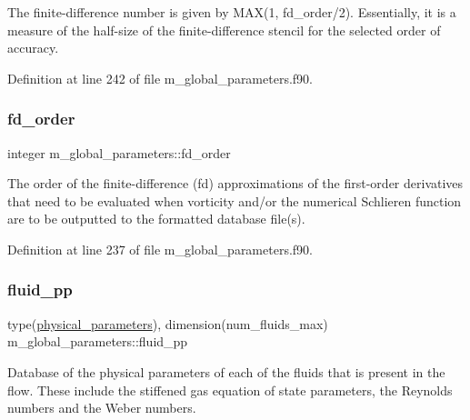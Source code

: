 The finite-\/difference number is given by M\+AX(1, fd\+\_\+order/2). Essentially, it is a measure of the half-\/size of the finite-\/difference stencil for the selected order of accuracy. 



Definition at line 242 of file m\+\_\+global\+\_\+parameters.\+f90.

\mbox{\label{namespacem__global__parameters_a8892cc67c7d04be4d8e6d02a86e209bc}} 
\subsubsection{\texorpdfstring{fd\+\_\+order}{fd\_order}}
{\footnotesize\ttfamily integer m\+\_\+global\+\_\+parameters\+::fd\+\_\+order}



The order of the finite-\/difference (fd) approximations of the first-\/order derivatives that need to be evaluated when vorticity and/or the numerical Schlieren function are to be outputted to the formatted database file(s). 



Definition at line 237 of file m\+\_\+global\+\_\+parameters.\+f90.

\mbox{\label{namespacem__global__parameters_a7297abec8863ecabf95e24ebdae46a17}} 
\subsubsection{\texorpdfstring{fluid\+\_\+pp}{fluid\_pp}}
{\footnotesize\ttfamily type(\hyperlink{structm__derived__types_1_1physical__parameters}{physical\+\_\+parameters}), dimension(num\+\_\+fluids\+\_\+max) m\+\_\+global\+\_\+parameters\+::fluid\+\_\+pp}



Database of the physical parameters of each of the fluids that is present in the flow. These include the stiffened gas equation of state parameters, the Reynolds numbers and the Weber numbers. 



